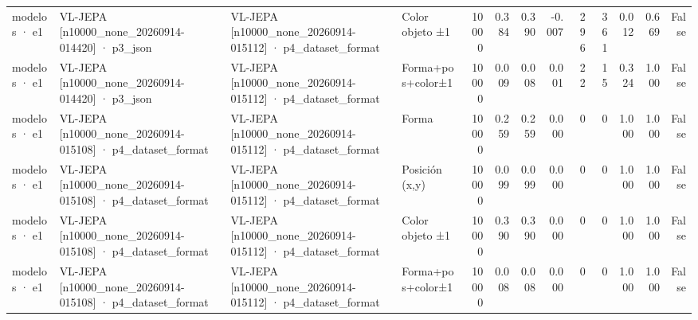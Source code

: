 \begin{tabular}{llllrrrrrrrrr}
modelos · e1 & VL-JEPA [n10000\_none\_20260914-014420] · p3\_json & VL-JEPA [n10000\_none\_20260914-015112] · p4\_dataset\_format & Color objeto ±1 & 10000 & 0.384 & 0.390 & -0.007 & 296 & 361 & 0.012 & 0.669 & False \\
modelos · e1 & VL-JEPA [n10000\_none\_20260914-014420] · p3\_json & VL-JEPA [n10000\_none\_20260914-015112] · p4\_dataset\_format & Forma+pos+color±1 & 10000 & 0.009 & 0.008 & 0.001 & 22 & 15 & 0.324 & 1.000 & False \\
modelos · e1 & VL-JEPA [n10000\_none\_20260914-015108] · p4\_dataset\_format & VL-JEPA [n10000\_none\_20260914-015112] · p4\_dataset\_format & Forma & 10000 & 0.259 & 0.259 & 0.000 & 0 & 0 & 1.000 & 1.000 & False \\
modelos · e1 & VL-JEPA [n10000\_none\_20260914-015108] · p4\_dataset\_format & VL-JEPA [n10000\_none\_20260914-015112] · p4\_dataset\_format & Posición (x,y) & 10000 & 0.099 & 0.099 & 0.000 & 0 & 0 & 1.000 & 1.000 & False \\
modelos · e1 & VL-JEPA [n10000\_none\_20260914-015108] · p4\_dataset\_format & VL-JEPA [n10000\_none\_20260914-015112] · p4\_dataset\_format & Color objeto ±1 & 10000 & 0.390 & 0.390 & 0.000 & 0 & 0 & 1.000 & 1.000 & False \\
modelos · e1 & VL-JEPA [n10000\_none\_20260914-015108] · p4\_dataset\_format & VL-JEPA [n10000\_none\_20260914-015112] · p4\_dataset\_format & Forma+pos+color±1 & 10000 & 0.008 & 0.008 & 0.000 & 0 & 0 & 1.000 & 1.000 & False \\
\bottomrule
\end{tabular}
